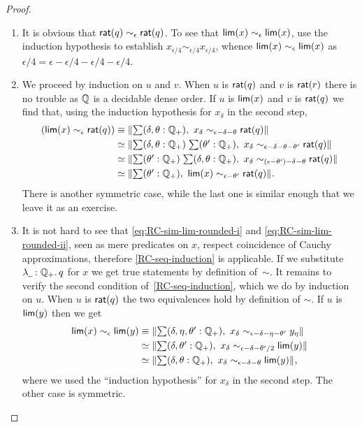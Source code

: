 \begin{proof}
  \mbox{}
  \begin{enumerate}

  \item 
    It is obvious that $\mathsf{rat}(q) \sim_\epsilon \mathsf{rat}(q)$. To see that $\mathsf{lim}(x)
    \sim_\epsilon \mathsf{lim}(x)$, use the induction hypothesis to establish $x_{\epsilon/4}
    \sim_{\epsilon/4} x_{\epsilon/4}$, whence $\mathsf{lim}(x) \sim_\epsilon \mathsf{lim}(x)$ as
    $\epsilon/4 = \epsilon - \epsilon/4 - \epsilon/4 - \epsilon/4$.

  \item We proceed by induction on $u$ and $v$. When $u$ is $\mathsf{rat}(q)$ and $v$ is
    $\mathsf{rat}(r)$ there is no trouble as $\mathbb{Q}$ is a decidable dense order. If $u$ is
    $\mathsf{lim}(x)$ and $v$ is $\mathsf{rat}(q)$ we find that, using the induction hypothesis for
    $x_\delta$ in the second step,
    \begin{align*}
      (\rclim(x) \sim_\epsilon \rcrat(q))
      &\jdeq
      \brck{\sm{\delta, \theta : \Qp} x_\delta \sim_{\epsilon - \delta - \theta} \rcrat(q)}
      \\
      &\simeq
      \brck{\sm{\delta, \theta : \Qp}{\theta' : \Qp}
        x_\delta \sim_{\epsilon - \delta - \theta - \theta'} \rcrat(q)}
      \\
      &\simeq
      \brck{\sm{\theta' : \Qp}{\delta, \theta : \Qp}
          x_\delta \sim_{(\epsilon - \theta') - \delta - \theta} \rcrat(q)}
      \\
      &\simeq
      \brck{\sm{\theta' : \Qp} \rclim(x) \sim_{\epsilon - \theta'} \rcrat(q)}.
    \end{align*}
    There is another symmetric case, while the last one is similar enough that we leave it
    as an exercise.

  \item It is not hard to see that \eqref{eq:RC-sim-lim-rounded-i} and
    \eqref{eq:RC-sim-lim-rounded-ii}, seen as mere predicates on $x$, respect coincidence
    of Cauchy approximations, therefore \autoref{RC-seq-induction} is applicable. If we
    substitute $\lam{\blank : \Qp} q$ for $x$ we get true statements by definition
    of~$\sim$. It remains to verify the second condition of~\autoref{RC-seq-induction},
    which we do by induction on $u$. When $u$ is $\mathsf{rat}(q)$ the two equivalences hold by
    definition of $\sim$. If $u$ is $\mathsf{lim}(y)$ then we get
    \begin{align*}
      \rclim(x) \sim_\epsilon \rclim(y) &\jdeq
      \brck{\sm{\delta, \eta, \theta' : \Qp}
        x_\delta \sim_{\epsilon - \delta - \eta - \theta'} y_\eta}
      \\
      &\simeq
      \brck{\sm{\delta, \theta' : \Qp}
        x_\delta \sim_{\epsilon - \delta - \theta'/2} \rclim(y)}
      \\
      &\simeq
      \brck{\sm{\delta, \theta : \Qp} x_\delta \sim_{\epsilon - \delta - \theta} \rclim(y)},
    \end{align*}
    where we used the ``induction hypothesis'' for $x_\delta$ in the second step. The
    other case is symmetric.


\end{enumerate}
\end{proof}
